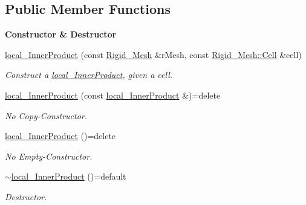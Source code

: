 \subsection*{Public Member Functions}
\begin{Indent}{\bf Constructor \& Destructor}\par
\begin{DoxyCompactItemize}
\item 
\hyperlink{classFVCode3D_1_1local__InnerProduct_ac827da4502cb7e61d699bcd77dff8ca6}{local\+\_\+\+Inner\+Product} (const \hyperlink{classFVCode3D_1_1Rigid__Mesh}{Rigid\+\_\+\+Mesh} \&r\+Mesh, const \hyperlink{classFVCode3D_1_1Rigid__Mesh_1_1Cell}{Rigid\+\_\+\+Mesh\+::\+Cell} \&cell)
\begin{DoxyCompactList}\small\item\em Construct a \hyperlink{classFVCode3D_1_1local__InnerProduct}{local\+\_\+\+Inner\+Product}, given a cell. \end{DoxyCompactList}\item 
\hyperlink{classFVCode3D_1_1local__InnerProduct_a546d5fa983c4903ec02487ec42681f70}{local\+\_\+\+Inner\+Product} (const \hyperlink{classFVCode3D_1_1local__InnerProduct}{local\+\_\+\+Inner\+Product} \&)=delete
\begin{DoxyCompactList}\small\item\em No Copy-\/\+Constructor. \end{DoxyCompactList}\item 
\hyperlink{classFVCode3D_1_1local__InnerProduct_add7ac815492cf1e1b5462641762e0c19}{local\+\_\+\+Inner\+Product} ()=delete
\begin{DoxyCompactList}\small\item\em No Empty-\/\+Constructor. \end{DoxyCompactList}\item 
\hyperlink{classFVCode3D_1_1local__InnerProduct_ae9fcf336863261bdb26a72667e58a2a4}{$\sim$local\+\_\+\+Inner\+Product} ()=default
\begin{DoxyCompactList}\small\item\em Destructor. \end{DoxyCompactList}\end{DoxyCompactItemize}
\end{Indent}
